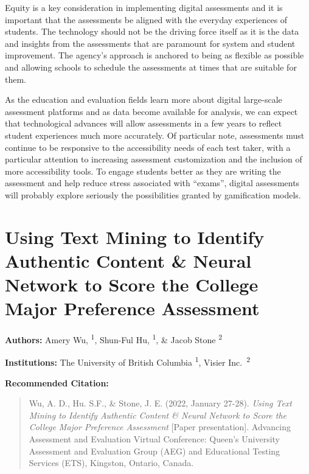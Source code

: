 \documentclass[
]{book}
\begin{document}
Equity is a key consideration in implementing digital assessments and it is important that the assessments be aligned with the everyday experiences of students. The technology should not be the driving force itself as it is the data and insights from the assessments that are paramount for system and student improvement. The agency's approach is anchored to being as flexible as possible and allowing schools to schedule the assessments at times that are suitable for them.

As the education and evaluation fields learn more about digital large-scale assessment platforms and as data become available for analysis, we can expect that technological advances will allow assessments in a few years to reflect student experiences much more accurately. Of particular note, assessments must continue to be responsive to the accessibility needs of each test taker, with a particular attention to increasing assessment customization and the inclusion of more accessibility tools. To engage students better as they are writing the assessment and help reduce stress associated with ``exams'', digital assessments will probably explore seriously the possibilities granted by gamification models.

\newpage

\hypertarget{using-text-mining-to-identify-authentic-content-neural-network-to-score-the-college-major-preference-assessment}{%
\section{Using Text Mining to Identify Authentic Content \& Neural Network to Score the College Major Preference Assessment}\label{using-text-mining-to-identify-authentic-content-neural-network-to-score-the-college-major-preference-assessment}}

\textbf{Authors:} Amery Wu, \textsuperscript{1}, Shun-Ful Hu, \textsuperscript{1}, \& Jacob Stone \textsuperscript{2}

\textbf{Institutions:} The University of British Columbia \textsuperscript{1}, Visier Inc.~\textsuperscript{2}

\textbf{Recommended Citation:}

\begin{quote}
Wu, A. D., Hu. S.F., \& Stone, J. E. (2022, January 27-28). \emph{Using Text Mining to Identify Authentic Content \& Neural Network to Score the College Major Preference Assessment} {[}Paper presentation{]}. Advancing Assessment and Evaluation Virtual Conference: Queen's University Assessment and Evaluation Group (AEG) and Educational Testing Services (ETS), Kingston, Ontario, Canada.
\end{quote}
\end{document}
